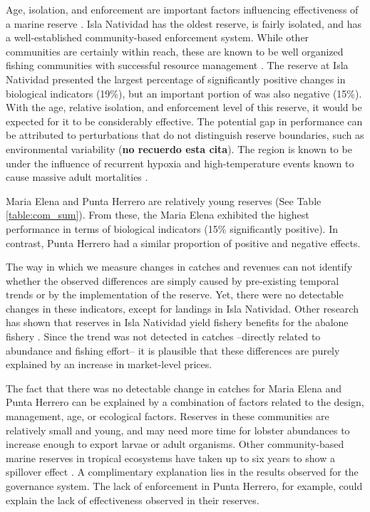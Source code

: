\documentclass{frontiersSCNS}
\theoremstyle{definition}
\theoremstyle{definition}
\theoremstyle{definition}
\theoremstyle{remark}
\begin{document}
Age, isolation, and enforcement are important factors influencing
effectiveness of a marine reserve \citep{edgar_2014-UO}. Isla Natividad
has the oldest reserve, is fairly isolated, and has a well-established
community-based enforcement system. While other communities are
certainly within reach, these are known to be well organized fishing
communities with successful resource management
\citep{mccay_2017-1m,mccay_2014-CN}. The reserve at Isla Natividad
presented the largest percentage of significantly positive changes in
biological indicators (19\%), but an important portion of was also
negative (15\%). With the age, relative isolation, and enforcement level
of this reserve, it would be expected for it to be considerably
effective. The potential gap in performance can be attributed to
perturbations that do not distinguish reserve boundaries, such as
environmental variability (\textbf{no recuerdo esta cita}). The region
is known to be under the influence of recurrent hypoxia and
high-temperature events known to cause massive adult mortalities
\citep{micheli_2012-EU}.

Maria Elena and Punta Herrero are relatively young reserves (See Table
\ref{table:com_sum}). From these, the Maria Elena exhibited the highest
performance in terms of biological indicators (15\% significantly
positive). In contrast, Punta Herrero had a similar proportion of
positive and negative effects.

The way in which we measure changes in catches and revenues can not
identify whether the observed differences are simply caused by
pre-existing temporal trends or by the implementation of the reserve.
Yet, there were no detectable changes in these indicators, except for
landings in Isla Natividad. Other research has shown that reserves in
Isla Natividad yield fishery benefits for the abalone fishery
\citep{rossetto_2015-V0}. Since the trend was not detected in catches
--directly related to abundance and fishing effort-- it is plausible
that these differences are purely explained by an increase in
market-level prices.

The fact that there was no detectable change in catches for Maria Elena
and Punta Herrero can be explained by a combination of factors related
to the design, management, age, or ecological factors. Reserves in these
communities are relatively small and young, and may need more time for
lobster abundances to increase enough to export larvae or adult
organisms. Other community-based marine reserves in tropical ecosystems
have taken up to six years to show a spillover effect
\citep{dasilva_2015-zX}. A complimentary explanation lies in the results
observed for the governance system. The lack of enforcement in Punta
Herrero, for example, could explain the lack of effectiveness observed
in their reserves.
\end{document}
